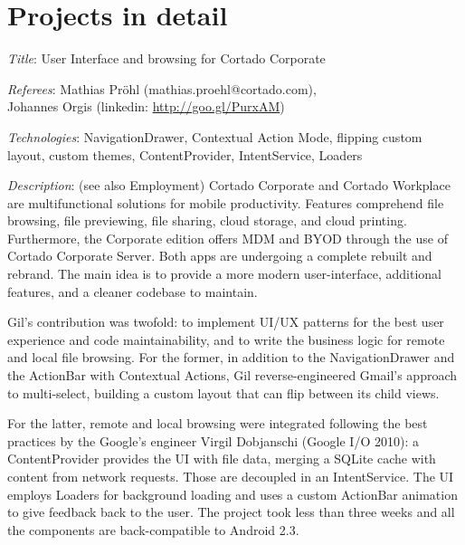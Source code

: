 \documentclass[letterpaper]{article}
\renewenvironment{itemize}{
  \begin{list}{}{
    \setlength{\leftmargin}{1.5em}
  }
}{
  \end{list}
}
\newenvironment{itemize1}{
  \begin{list}{}{
    \setlength{\leftmargin}{0em}
  }
}{
  \end{list}
}
\begin{document}
\section*{Projects in detail}
\begin{itemize1}
\item
\begin{itemize}
\item {\it Title}: User Interface and browsing for Cortado Corporate 
\item {\it Referees}: Mathias Pr\"ohl (mathias.proehl@cortado.com),\\\phantom{xxxxxxx.}Johannes Orgis (linkedin: \url{http://goo.gl/PurxAM})
\item {\it Technologies}: NavigationDrawer, Contextual Action Mode, flipping custom layout, custom themes, ContentProvider, IntentService, Loaders

\item {\it Description}: (see also Employment) 
Cortado Corporate and Cortado Workplace are multifunctional solutions for mobile productivity. Features comprehend file browsing, file previewing, file sharing, cloud storage, and cloud printing. Furthermore, the Corporate edition offers MDM and BYOD through the use of Cortado Corporate Server. Both apps are undergoing a complete rebuilt and rebrand. The main idea is to provide a more modern user-interface, additional features, and a cleaner codebase to maintain.
\medskip

Gil's contribution was twofold: to implement UI/UX patterns for the best user experience and code maintainability, and to write the business logic for remote and local file browsing. 
For the former, in addition to the NavigationDrawer and the ActionBar with Contextual Actions, Gil reverse-engineered Gmail's approach to multi-select, building a custom layout that can flip between its child views. 
\medskip

For the latter, remote and local browsing were integrated following the best practices by the Google's engineer Virgil Dobjanschi (Google I/O 2010): a ContentProvider provides the UI with file data, merging a SQLite cache with content from network requests. Those are decoupled in an IntentService. The UI employs Loaders for background loading and uses a custom ActionBar animation to give feedback back to the user. The project took less than three weeks and all the components are back-compatible to Android 2.3.
\end{itemize}

\bigskip


\end{itemize1}
\end{document}
